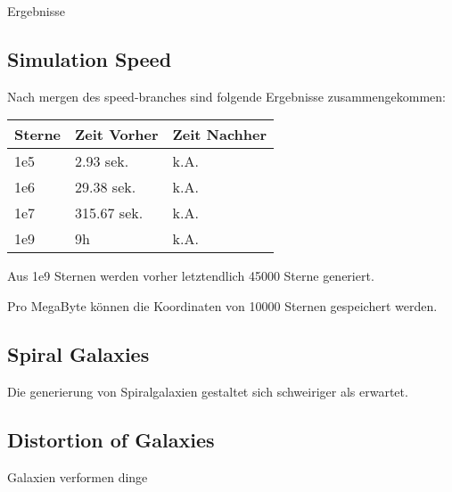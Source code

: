 Ergebnisse

\subsection{Simulation Speed}

Nach mergen des speed-branches sind folgende Ergebnisse zusammengekommen:

\begin{tabular}{l | l | l}

Sterne  & Zeit Vorher   & Zeit Nachher \\ \hline\hline
1e5     & 2.93 sek.     & k.A. \\
1e6     & 29.38 sek.    & k.A. \\
1e7     & 315.67 sek.   & k.A. \\
1e9     & 9h            & k.A. \\

\end{tabular}

Aus 1e9 Sternen werden vorher letztendlich 45000 Sterne generiert.

Pro MegaByte können die Koordinaten von 10000 Sternen gespeichert werden.

\subsection{Spiral Galaxies}

Die generierung von Spiralgalaxien gestaltet sich schweiriger als erwartet.

\subsection{Distortion of Galaxies}

Galaxien verformen dinge
